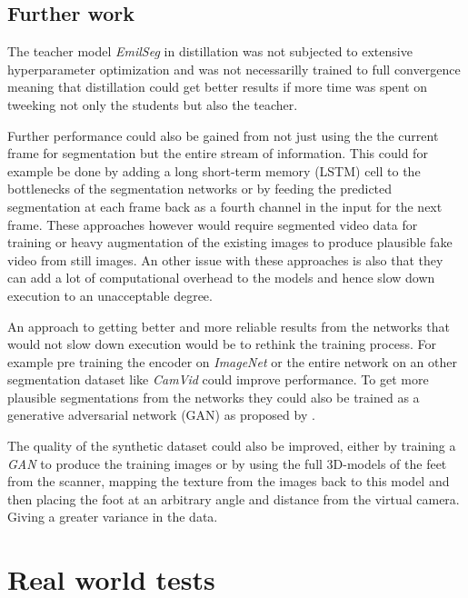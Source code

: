 \documentclass{kththesis}
\begin{document}
\section{Further work}
The teacher model \textit{EmilSeg} in distillation
was not subjected to extensive hyperparameter optimization and was not
necessarilly trained to full convergence meaning that distillation could get
better results if more time was spent on tweeking not only the students but
also the teacher.

Further performance could also be gained from not just using the the current
frame for segmentation but the entire stream of information. This could for
example be done by adding a long short-term memory (LSTM) cell to the
bottlenecks of the segmentation networks or by feeding the predicted
segmentation at each frame back as a fourth channel in the input for the next
frame. These approaches however would require segmented video data for training
or heavy augmentation of the existing images to produce plausible fake video
from still images. An other issue with these approaches is also that they can
add a lot of computational overhead to the models and hence slow down execution to an
unacceptable degree.

An approach to getting better and more reliable results from the networks that
would not slow down execution would be to rethink the training process. For
example pre training the encoder on \textit{ImageNet} or the entire network on
an other segmentation dataset like \textit{CamVid} could improve performance. To
get more plausible segmentations from the networks they could also be trained as
a generative adversarial network
(GAN) as proposed by \textcite{AdverserialSegmentation}.

The quality of the synthetic dataset could also be improved, either by training a
\textit{GAN} to produce the training images or by using the full 3D-models of
the feet from the scanner, mapping the texture from the images back to this model
and then placing the foot at an arbitrary angle and distance from the virtual
camera. Giving a greater variance in the data.

\printbibliography[heading=bibintoc]%

\appendix

\chapter{Real world tests} \label{chapter:real_world}
\end{document}
